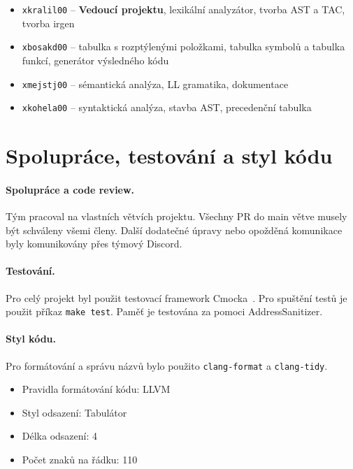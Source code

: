 \documentclass[a4paper,11pt]{article}
\begin{document}
\begin{itemize}
  \item \texttt{xkralil00} -- \textbf{Vedoucí projektu},  lexikální analyzátor, tvorba AST a TAC, tvorba irgen
  \item \texttt{xbosakd00} -- tabulka s rozptýlenými položkami, tabulka symbolů a tabulka funkcí, generátor výsledného kódu
  \item \texttt{xmejstj00} -- sémantická analýza, LL gramatika, dokumentace
  \item \texttt{xkohela00} -- syntaktická analýza, stavba AST, precedenční tabulka
\end{itemize}

 
\section{Spolupráce, testování a styl kódu}
 
\paragraph{Spolupráce a code review.}
Tým pracoval na vlastních větvích projektu. Všechny PR do main větve musely být schváleny všemi členy. Další dodatečné úpravy nebo opožděná komunikace byly komunikovány přes týmový Discord.
 
\paragraph{Testování.}
    Pro celý projekt byl použit testovací framework Cmocka~\cite{cmoccka}. Pro spuštění testů je použit příkaz \texttt{make test}. Paměť je testována za pomoci AddressSanitizer.
 
\paragraph{Styl kódu.} Pro formátování a správu názvů bylo použito \texttt{clang-format} a \texttt{clang-tidy}.
\begin{itemize}
    \item Pravidla formátování kódu: LLVM
    \item Styl odsazení: Tabulátor
    \item Délka odsazení: 4
    \item Počet znaků na řádku: 110
\end{itemize}
\end{document}

